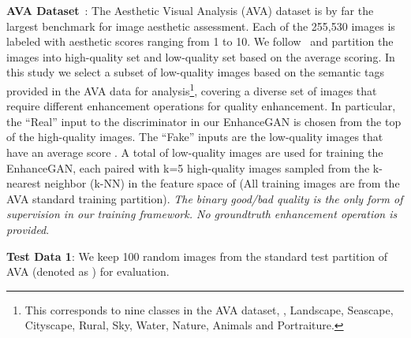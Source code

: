 \documentclass[sigconf]{acmart}
\begin{document}
\noindent\textbf{AVA Dataset}~\cite{murray2012ava}:
The Aesthetic Visual Analysis (AVA) dataset is by far the largest benchmark for image aesthetic assessment. Each of the 255,530 images is labeled with aesthetic scores ranging from 1 to 10. We follow~\cite{murray2012ava} and partition the images into high-quality set and low-quality set based on the average scoring. In this study we select a subset of low-quality images based on the semantic tags provided in the AVA data for analysis\footnote{This corresponds to nine classes in the AVA dataset, \ie, Landscape, Seascape, Cityscape, Rural, Sky, Water, Nature, Animals and Portraiture.}, covering a diverse set of images that require different enhancement operations for quality enhancement. In particular, the ``Real'' input to the discriminator in our EnhanceGAN is chosen from the top  of the high-quality images. The ``Fake'' inputs are the low-quality images that have an average score . A total of  low-quality images are used for training the EnhanceGAN, each paired with k=5 high-quality images sampled from the k-nearest neighbor (k-NN) in the feature space of  (All training images are from the AVA standard training partition). \textit{The binary good/bad quality is the only form of supervision in our training framework. No groundtruth enhancement operation is provided}. 

\noindent\textbf{Test Data 1}:
We keep 100 random images from the standard test partition of AVA (denoted as ) for evaluation.
\end{document}
